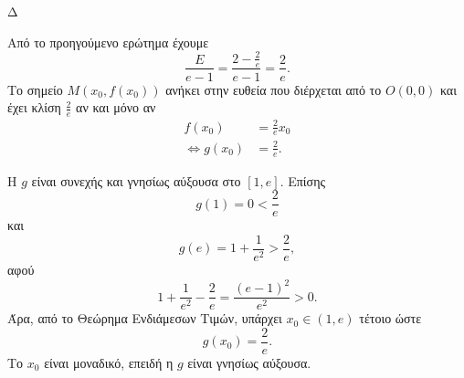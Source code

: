 \begin{thema}{Δ}
\begin{erwthma}
\item Από το προηγούμενο ερώτημα έχουμε
\[
\frac{E}{e-1}
=\frac{2-\frac{2}{e}}{e-1}
=\frac{2}{e}.
\]
Το σημείο $M(x_0,f(x_0))$ ανήκει στην ευθεία που διέρχεται από το $O(0,0)$ και έχει κλίση $\frac{2}{e}$ αν και μόνο αν
\begin{align*}
f(x_0)&=\frac{2}{e}x_0\\
\Leftrightarrow g(x_0)&=\frac{2}{e}.
\end{align*}

Η $g$ είναι συνεχής και γνησίως αύξουσα στο $[1,e]$. Επίσης
\[
g(1)=0<\frac{2}{e}
\]
και
\[
g(e)=1+\frac{1}{e^2}>\frac{2}{e},
\]
αφού
\[
1+\frac{1}{e^2}-\frac{2}{e}
=\frac{(e-1)^2}{e^2}>0.
\]
Άρα, από το Θεώρημα Ενδιάμεσων Τιμών, υπάρχει $x_0\in(1,e)$ τέτοιο ώστε
\[
g(x_0)=\frac{2}{e}.
\]
Το $x_0$ είναι μοναδικό, επειδή η $g$ είναι γνησίως αύξουσα.
\end{erwthma}
\end{thema}

